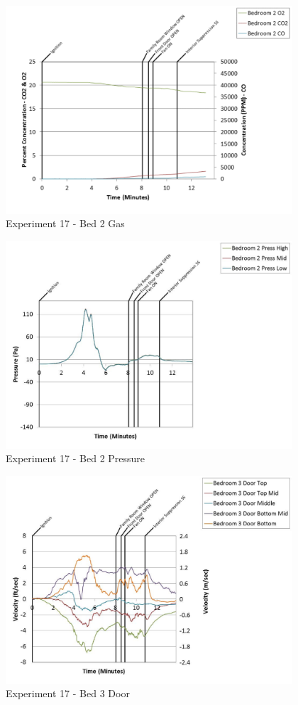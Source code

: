 \documentclass{article}
\begin{document}
\begin{appendices}
	\begin{figure}[h!]
		\centering
		\includegraphics[height=3.05in]{0_Images/Results_Charts/Exp_17_Charts/Bed2Gas.pdf}
		\caption{Experiment 17 - Bed 2 Gas}
	\end{figure}
 
	\clearpage

	\begin{figure}[h!]
		\centering
		\includegraphics[height=3.05in]{0_Images/Results_Charts/Exp_17_Charts/Bed2Pressure.pdf}
		\caption{Experiment 17 - Bed 2 Pressure}
	\end{figure}
 

	\begin{figure}[h!]
		\centering
		\includegraphics[height=3.05in]{0_Images/Results_Charts/Exp_17_Charts/Bed3Door.pdf}
		\caption{Experiment 17 - Bed 3 Door}
	\end{figure}
 

\end{appendices}
\end{document}

